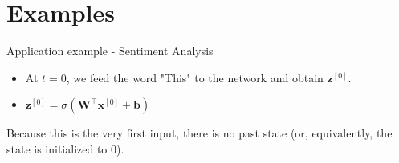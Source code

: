 \section{Examples}


\begin{frame} {Application example - Sentiment Analysis}
  \begin{itemize}
    \item At $t = 0$, we feed the word "This" to the network and obtain $\bm{z}^{[0]}$.
    \item $\bm{z}^{[0]} = \sigma(\bm{W}^\top \bm{x}^{[0]} + \bm{b})$
  \end{itemize}
  \begin{figure}
      \centering
  \end{figure}
  Because this is the very first input, there is no past state (or, equivalently, the state is initialized to 0).
\end{frame}

